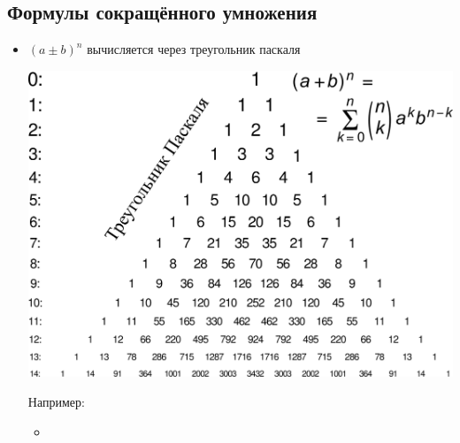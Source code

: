 \subsection{Формулы сокращённого умножения}
\begin{itemize}
	\item $(a \pm b)^n$ вычисляется через треугольник паскаля\\
	\begin{center}
		\includegraphics[scale=0.2]{./mh/algebra/elementary/rational_expressions/Pascal_triangle.png}
	\end{center}
	Например:\\
	\begin{itemize}
		\item 
	\end{itemize}
\end{itemize}